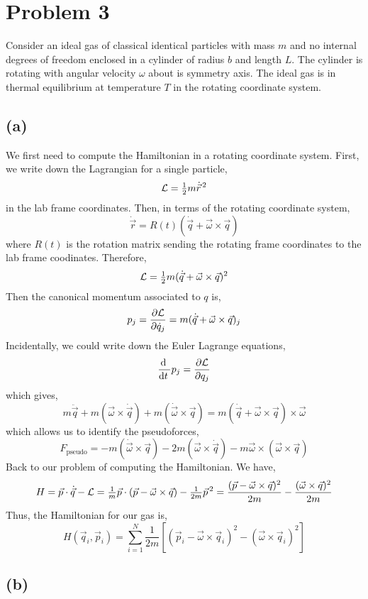 \documentclass[12pt]{extarticle}
\begin{document}
\section{Problem 3}

Consider an ideal gas of classical identical particles with mass $m$ and no internal degrees of freedom enclosed in a cylinder of radius $b$ and length $L$. The cylinder is rotating with angular velocity $\omega$ about is symmetry axis. The ideal gas is in thermal equilibrium at temperature $T$ in the rotating coordinate system.

\subsection*{(a)}

We first need to compute the Hamiltonian in a rotating coordinate system. First, we write down the Lagrangian for a single particle,
\[ \mathcal{L} = \tfrac{1}{2} m \dot{\vec{r}}^{\, 2} \]
in the lab frame coordinates. Then, in terms of the rotating coordinate system,
\[ \dot{\vec{r}} = R(t) (\dot{\vec{q}} + \vec{\omega} \times \vec{q} ) \] 
where $R(t)$ is the rotation matrix sending the rotating frame coordinates to the lab frame coodinates. Therefore,
\[ \mathcal{L} = \tfrac{1}{2} m (\dot{\vec{q}} + \vec{\omega} \times \vec{q})^2 \] 
Then the canonical momentum associated to $q$ is,
\[ p_j = \frac{\partial{\mathcal{L}}}{\partial{\dot{q}_j}} = m (\dot{\vec{q}} + \vec{\omega} \times \vec{q})_j \]
Incidentally, we could write down the Euler Lagrange equations,
\[ \frac{\mathrm{d} \:}{\mathrm{d}t \:} p_j = \frac{\partial{\mathcal{L}}}{\partial{q_j}} \]
which gives,
\[ m \ddot{\vec{q}} + m (\vec{\omega} \times \dot{\vec{q}}) + m (\dot{\vec{\omega}} \times \vec{q}) = m (\dot{\vec{q}} + \vec{\omega} \times \vec{q}) \times \vec{\omega} \]
which allows us to identify the pseudoforces,
\[ F_{\text{pseudo}} = - m (\dot{\vec{\omega}} \times \vec{q}) - 2 m (\vec{\omega} \times \dot{\vec{q}}) - m \vec{\omega} \times (\vec{\omega} \times \vec{q}) \]
Back to our problem of computing the Hamiltonian. We have,
\[ H = \vec{p} \cdot \dot{\vec{q}} - \mathcal{L} = \tfrac{1}{m} \vec{p} \cdot (\vec{p} -  \vec{\omega} \times \vec{q}) - \tfrac{1}{2m} \vec{p}^{\, 2} = \frac{(\vec{p} - \vec{\omega} \times \vec{q})^2}{2 m} - \frac{(\vec{\omega} \times \vec{q})^2}{2m} \] 
Thus, the Hamiltonian for our gas is,
\[ H(\vec{q}_i, \vec{p}_i) = \sum_{i = 1}^N \frac{1}{2 m} \left[ (\vec{p}_i - \vec{\omega} \times \vec{q}_i)^2 - (\vec{\omega} \times \vec{q}_i)^2 \right] \]

\subsection*{(b)}
\end{document}
